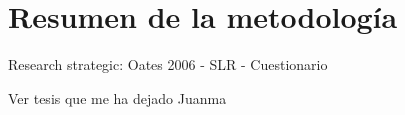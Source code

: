 
\section{Resumen de la metodología}
\label{sec:ResumenMetodologia}

Research strategic: Oates 2006
- SLR
- Cuestionario

Ver tesis que me ha dejado Juanma